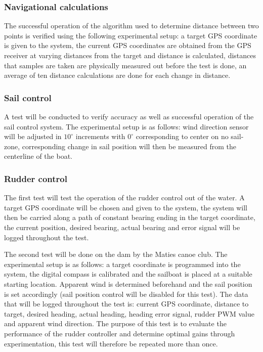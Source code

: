 \subsubsection{Navigational calculations}
The successful operation of the algorithm used to determine distance between two points is verified using the following experimental setup: a target GPS 
coordinate is given to the system, the current GPS coordinates are obtained from the GPS receiver at varying distances from the target and distance is 
calculated, distances that samples are taken are physically measured out before the test is done, an average of ten distance calculations are done for each
change in distance. 


\subsubsection{Sail control}
A test will be conducted to verify accuracy as well as successful operation of the sail control system. The experimental setup is as follows: wind direction 
sensor will be adjusted in $10^{\circ}$ increments with $0^{\circ}$ corresponding to center on no sail-zone, corresponding change in sail position will then 
be measured from the centerline of the boat.

\subsubsection{Rudder control}
The first test will test the operation of the rudder control out of the water. A target GPS coordinate will be chosen and given to the system, the system 
will then be carried along a path of constant bearing ending in the target coordinate, the current position, desired bearing, actual bearing and error signal
will be logged throughout the test. 

The second test will be done on the dam by the Maties canoe club. The experimental setup is as follows: a target coordinate is programmed into the system,
the digital compass is calibrated and the sailboat is placed at a suitable starting location. Apparent wind is determined beforehand and the sail position is 
set accordingly (sail position control will be disabled for this test). The data that will be logged throughout the test is: current GPS coordinate, distance 
to target, desired heading, actual heading, heading error signal, rudder PWM value and apparent wind direction. The purpose of this test is to evaluate the performance
of the rudder controller and determine optimal gains through experimentation, this test will therefore be repeated more than once.

